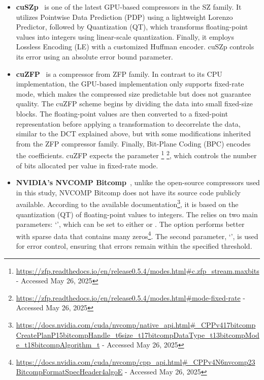 \documentclass[Ingles,Final]{ic-tese-v3}
\begin{document}
\begin{itemize}
    \item \textbf{cuSZp}~\cite{cuszp} is one of the latest GPU-based compressors in the SZ family. It utilizes Pointwise Data Prediction (PDP) using a lightweight Lorenzo Predictor, followed by Quantization (QT), which transforms floating-point values into integers using linear-scale quantization. Finally, it employs Lossless Encoding (LE) with a customized Huffman encoder. cuSZp controls its error using an absolute error bound parameter.

    \item \textbf{cuZFP}~\cite{zfp} is a compressor from ZFP family. In contrast to its CPU implementation, the GPU-based implementation only supports fixed-rate mode, which makes the compressed size predictable but does not guarantee quality. The cuZFP \compression scheme begins by dividing the data into small fixed-size blocks. The floating-point values are then converted to a fixed-point representation before applying a transformation to decorrelate the data, similar to the DCT explained above, but with some modifications inherited from the ZFP compressor family. Finally, Bit-Plane Coding (BPC) encodes the coefficients. cuZFP expects the parameter \footnote{\url{https://zfp.readthedocs.io/en/release0.5.4/modes.html\#c.zfp_stream.maxbits} - Accessed May 26, 2025} \footnote{\url{https://zfp.readthedocs.io/en/release0.5.4/modes.html\#mode-fixed-rate} - Accessed May 26, 2025}, which controls the number of bits allocated per value in fixed-rate mode. 

    \item \textbf{NVIDIA's NVCOMP Bitcomp}~\cite{nvcomp}, unlike the open-source compressors used in this study, NVCOMP Bitcomp does not have its source code publicly available. According to the available documentation\footnote{\url{https://docs.nvidia.com/cuda/nvcomp/native_api.html#_CPPv417bitcompCreatePlanP15bitcompHandle_t6size_t17bitcompDataType_t13bitcompMode_t18bitcompAlgorithm_t} - Accessed May 26, 2025}, it is based on the quantization (QT) of floating-point values to integers. The \compression relies on two main parameters: `', which can be set to either  or . The  option performs better with sparse data that contains many zeros\footnote{\url{https://docs.nvidia.com/cuda/nvcomp/cpp_api.html#_CPPv4N6nvcomp23BitcompFormatSpecHeader4algoE} - Accessed May 26, 2025}. The second parameter, `', is used for error control, ensuring that errors remain within the specified threshold.
\end{itemize}
\end{document}
